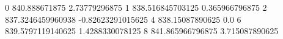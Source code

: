 0 840.888671875 2.73779296875
1 838.516845703125 0.365966796875
2 837.3246459960938 -0.82623291015625
4 838.15087890625 0.0
6 839.5797119140625 1.4288330078125
8 841.865966796875 3.715087890625
